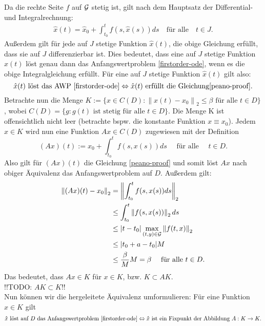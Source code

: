 Da die rechte Seite $f$ auf ${\cal G}$ stetig ist, gilt nach dem Hauptsatz der Differential- und Integralrechnung:
\begin{align}
    \hat{x}(t) = \hat{x}_0 + \int_{t_0}^{t} f(s, \hat{x}(s)) ds \quad \text{für alle} \quad t \in J.
    \label{peano-proof}
\end{align}
Außerdem gilt für jede auf $J$ stetige Funktion $\hat{x}(t)$, die obige Gleichung erfüllt, dass sie auf $J$
differenzierbar ist. Dies bedeutet, dass eine auf $J$ stetige Funktion $\hat{x}(t)$ löst genau dann das
Anfangswertproblem \eqref{firstorder-ode}, wenn es die obige Integralgleichung erfüllt. Für eine auf $J$ stetige
Funktion $\hat{x}(t)$ gilt also:
\[
    \hat{x}(t) \text{ löst das AWP \eqref{firstorder-ode}}  \Leftrightarrow \hat{x}(t)
    \text{ erfüllt die Gleichung} \eqref{peano-proof}.
\]
Betrachte nun die Menge $K := \{ x \in C(D): \left\lVert x(t) - x_0 \right\rVert_2 \leq \beta \text{ für alle }
t \in D \}$, wobei $C(D)=\{g: g(t) \text{ ist stetig für alle } t \in D \}$. Die Menge K ist offensichtlich nicht leer
(betrachte bspw. die konstante Funktion $x \equiv x_0$). Jedem $x \in K$ wird nun eine Funktion $Ax \in C(D)$ zugewiesen
mit der Definition
\[
    (Ax)(t) := x_0 + \int_{t_0}^{t} f(s, x(s)) ds \quad \text{ für alle } \quad t \in D.
\]
Also gilt für $(Ax)(t)$ die Gleichung \eqref{peano-proof} und somit löst $Ax$ nach obiger Äquivalenz das
Anfangswertproblem auf $D$. Außerdem gilt:
\begin{align*}
    \left\lVert (Ax)(t) - x_0 \right\rVert_2 &= \left\lVert \int_{t_0}^{t} f(s, x(s)) ds \right\rVert_2 \\
    &\leq \int_{t_0}^{t} \left\lVert f(s, x(s)) \right\rVert_2 ds \\
    &\leq |t - t_0| \max_{(t,y)\in {\cal G}}\left\lVert f(t,x)\right\rVert_2 \\
    &\leq |t_0 + a - t_0| M \\
    &\leq \frac{\beta}{M}M = \beta \quad \text{ für alle } t \in D.
\end{align*}
Das bedeutet, dass $Ax \in K$ für $x \in K$, bzw. $K \subset AK$.
\\!!TODO: $AK \subset K $!!\\
Nun können wir die hergeleitete Äquivalenz umformulieren: Für eine Funktion $\hat{x} \in K$ gilt
\[
    \hat{x} \text{ löst auf $D$ das Anfangswertproblem } \eqref{firstorder-ode} \Leftrightarrow \hat{x}
    \text{ ist ein Fixpunkt der Abbildung } A:K \rightarrow K.
\]
